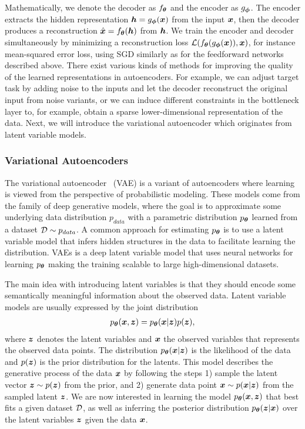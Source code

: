 Mathematically, we denote the decoder as $f_{{\bm{\theta}}}$ and the encoder as $g_{{\bm{\phi}}}$. The encoder extracts the hidden representation ${\bm{h}} = g_{{\bm{\phi}}}({\bm{x}})$ from the input ${\bm{x}}$, then the decoder produces a reconstruction $\hat{{\bm{x}}} = f_{{\bm{\theta}}}({\bm{h}})$ from ${\bm{h}}$. We train the encoder and decoder simultaneously by minimizing a reconstruction loss ${\mathcal{L}}(f_{{\bm{\theta}}}(g_{{\bm{\phi}}}({\bm{x}})), {\bm{x}})$, for instance mean-squared error loss, using SGD similarly as for the feedforward networks described above. There exist various kinds of methods for improving the quality of the learned representations in autoencoders. For example, we can adjust target task by adding noise to the inputs and let the decoder reconstruct the original input from noise variants, or we can induce different constraints in the bottleneck layer to, for example, obtain a sparse lower-dimensional representation of the data. Next, we will introduce the variational autoencoder which originates from latent variable models. 

\subsubsection{Variational Autoencoders}

The variational autoencoder~\cite{kingma2013auto} (VAE) is a variant of autoencoders where learning is viewed from the perspective of probabilistic modeling. These models come from the family of deep generative models, where the goal is to approximate some underlying data distribution $p_{data}$ with a parametric distribution $p_{{\bm{\theta}}}$ learned from a dataset ${\mathcal{D}} \sim p_{data}$. A common approach for estimating $p_{{\bm{\theta}}}$ is to use a latent variable model that infers hidden structures in the data to facilitate learning the distribution. VAEs is a deep latent variable model that uses neural networks for learning $p_{{\bm{\theta}}}$ making the training scalable to large high-dimensional datasets. 

The main idea with introducing latent variables is that they should encode some semantically meaningful information about the observed data. Latent variable models are usually expressed by the joint distribution 
\begin{align}
	p_{{\bm{\theta}}}({\bm{x}}, {\bm{z}}) = p_{{\bm{\theta}}}({\bm{x}} | {\bm{z}}) p({\bm{z}}),
\end{align}
where ${\bm{z}}$ denotes the latent variables and ${\bm{x}}$ the observed variables that represents the observed data points. The distribution $p_{{\bm{\theta}}}({\bm{x}} | {\bm{z}})$ is the likelihood of the data and $p({\bm{z}})$ is the prior distribution for the latents. This model describes the generative process of the data ${\bm{x}}$ by following the steps 1) sample the latent vector ${\bm{z}} \sim p({\bm{z}})$ from the prior, and 2) generate data point ${\bm{x}} \sim p({\bm{x}} | {\bm{z}})$ from the sampled latent ${\bm{z}}$. We are now interested in learning the model $p_{{\bm{\theta}}}({\bm{x}}, {\bm{z}})$ that best fits a given dataset ${\mathcal{D}}$, as well as inferring the posterior distribution $p_{{\bm{\theta}}}({\bm{z}} | {\bm{x}})$ over the latent variables ${\bm{z}}$ given the data ${\bm{x}}$.

